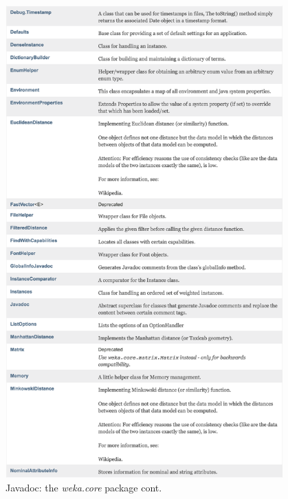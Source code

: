\begin{figure}[!thp]
\ContinuedFloat
\centering
\includegraphics[width=0.95\textwidth]{images/B5_1b2_2.png}
\caption{Javadoc: the \textit{weka.core} package cont.}
\end{figure}

